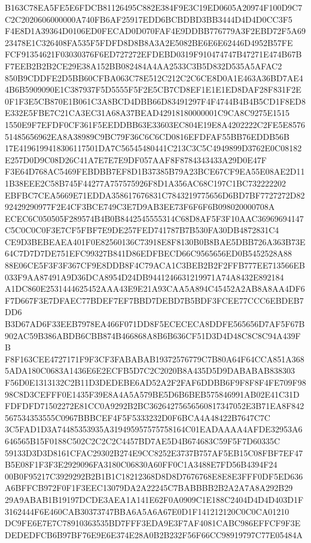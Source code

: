 \documentclass[UTF8,fontset=fandol,zihao=-4,a4paper]{ctexart}
\begin{document}
{{B163C78EA5FE5E6FDCB81126495C882E384F9E3C19ED0605A20974F100D9C7C2C2020606000000A740FB6AF25917EDD6BCBDBD3BB3444D4D4D0CC3F5
F4E8D1A39364D0106ED0FECAD0D070FAF4E9DDBB776779A3F2EBD72F5A6923478E1C326408FA535F5FDFD8D8B8A3A2E5082BE6E6E62446D4952B57FE
FCF91354621F03030376F6ED727272EFDEBD0319F910474747B47271E474B67BF7EEB2B2B2CE29E38A152BB082484A4AA2533C3B5D832D535A5AFAC2
850B9CDDFE2D5BB60CFBA063C78E512C212C2C6CE8D0A1E463A36BD7AE44B6B5909090E1C387937F5D5555F5F2E5CB7CD8EF1E1E1ED8DAF28F831F2E
0F1F3E5CB870E1B061C3A8BCD4DBB66D83491297F4F4744B4B4B5CD1F8ED8E332E5FBE7C21CA3EC31A68A37BEAD42918180000001C9CA8C9275E1515
1550E9F7EFDF0CF361F5EEDDBB63E33603EC804E19E8A4202222C2FE5E857651485656962EA8A38989C9BC79F36C6C6CD0816EFDFAF55BB76EDDB56B
17E4196199418306117501DA7C56545480441C213C3C5C4949899D3762E0C08182E257D0D9C08D26C41A7E7E7E9DF057AAF8F8784343433A29D0E47F
F3E64D768AC5469FEBDBB7EF8D1B37385B79A23BCE67CF9EA55E08AE2D111B38EEE2C58B745F44277A757575926F8D1A356AC68C197C1BC732222202
EBFBC7CEA5669E71EDDA358617676831C7843219775656D6BD7BF7727272D8292429290977F2E4CF3BCE749C3E7D9AB3EE73F6F6F6B098020000708A
ECEC6C050505F289574B4B0B8442545555314C68D8AF5F3F10AAC36969694147C5C0C0C0F3E7CF5FBF7E9DE257FED741787B7B530FA30DB4872831C4
CE9D3BEBEAEA401F0E82560136C73918E8F8130B0B8BAE5DBB726A363B73E64C7D7D7DE751EFC99327B841D86EDFBECD66C9565656ED0B5452528A88
88E06CE5F3F3F367CF9E8DDB8F4C79ACA1C3BEB2B2F2FFB777EE713566EB033F9AA87491A9D36DCA8954D24DB9441246631219971A74A8432E892184
A1DC860E2531444625452AAA43E9E21A93CAA5A894C45452A2AB8A8AA4DF6F7D667F3E7DFAEC77BDEF7EF7BBD7DEBD7B5BDF3FCEE77CCC6EBDEB7DD6
B3D67AD6F33EEB7978EA466F071DD8F5ECECECA8DDFE565656D7AF5F67B902AC59B386ABDB6CBB874B466868A8B6B636CF51D3D4D48C8C8C94A439FB
F8F163CEE4727171F9F3CF3FABABAB19372576779C7B80A64F64CCA851A3685ADA180C0683A1436E6E2ECFB5D7C2C2020B8A435D5D9DABABAB838303
F56D0E1313132C2B11D3DEDEBE6AD52A2F2FAF6DDBB6F9F8F8F4FE709F9898C8D3CEFFF0E1435F39E8A4A5A579BE5D6B6BEB575846991AB02E41C31D
FDFDFD71502272E81CC0A9292B2BC36264275656560817347052E3B71EA8F842567534353555C0967BBBCEF4F5F5333232D0F6BCA4A48422B7647C7C
3C5FAD1D3A74485353935A319495957575758164C01EADAAAA4AFDE32953A6646565B15F0188C502C2C2C2C4457BD7AE5D4B674683C59F5F7D60335C
59133D3D3D8161CFAC29302B274E9CC8252E3737B757AF5EB15C08FBF7EF47B5E08F1F3F3E2929096FA3180C06830A60FF0C1A3488E7FD56B4394F24
00B0F95217C3929292B2B1B1C18212368D8D8D7676768E8E8E3FFF0DF5ED636A6BFFCB972F0F1F3EEC13079DA2A22245C7BABBBB2B2A2A7A8A292B29
29A9ABAB1B19197DCDE3AEA1A141E62F0A0909C1E188C2404D4D4D403D1F3162444F6E460CAB30373747BBA6A5A6A67E0D1F141212120C0C0CA01210
DC9FE6E7E7C78910363535BD7FFF3EDA9E3F7AF4081CABC986EFFCF9F3EDEDEDFCB6B97BF76E9E6E374E28A0B2B232F56F66CC98919797C77E05484A
}}
\end{document}
